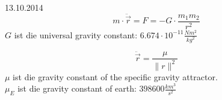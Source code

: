 \begin{section}{13.10.2014}
 \[ m \cdot \ddot{\vec{r}} = F = - G \cdot \frac{m_1m_2}{r^2} \]
 $G$ ist die  universal gravity constant: $6.674 \cdot 10^{-11} \frac{Nm^2}{kg^2}$
 
 \[ \ddot{\vec{r}} = \frac{\mu}{\|r\|^2} \]
 $\mu$ ist die gravity constant of the specific gravity attractor.\\
 $\mu_E$ ist die  gravity constant of earth: $398600 \frac{km^3}{s^2}$
\end{section}
